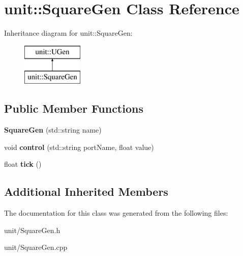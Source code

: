 \hypertarget{classunit_1_1SquareGen}{}\section{unit\+:\+:Square\+Gen Class Reference}
\label{classunit_1_1SquareGen}
Inheritance diagram for unit\+:\+:Square\+Gen\+:\begin{figure}[H]
\begin{center}
\leavevmode
\includegraphics[height=2.000000cm]{classunit_1_1SquareGen}
\end{center}
\end{figure}
\subsection*{Public Member Functions}
\begin{DoxyCompactItemize}
\item 
{\bfseries Square\+Gen} (std\+::string name)\hypertarget{classunit_1_1SquareGen_a626505e8ade08b9383acda8901aa23b5}{}\label{classunit_1_1SquareGen_a626505e8ade08b9383acda8901aa23b5}

\item 
void {\bfseries control} (std\+::string port\+Name, float value)\hypertarget{classunit_1_1SquareGen_a8a25dc2b8c5d1ec7857e4da7ec96cecc}{}\label{classunit_1_1SquareGen_a8a25dc2b8c5d1ec7857e4da7ec96cecc}

\item 
float {\bfseries tick} ()\hypertarget{classunit_1_1SquareGen_a119ab47582ee5814687b87db6a71644c}{}\label{classunit_1_1SquareGen_a119ab47582ee5814687b87db6a71644c}

\end{DoxyCompactItemize}
\subsection*{Additional Inherited Members}


The documentation for this class was generated from the following files\+:\begin{DoxyCompactItemize}
\item 
unit/Square\+Gen.\+h\item 
unit/Square\+Gen.\+cpp\end{DoxyCompactItemize}
